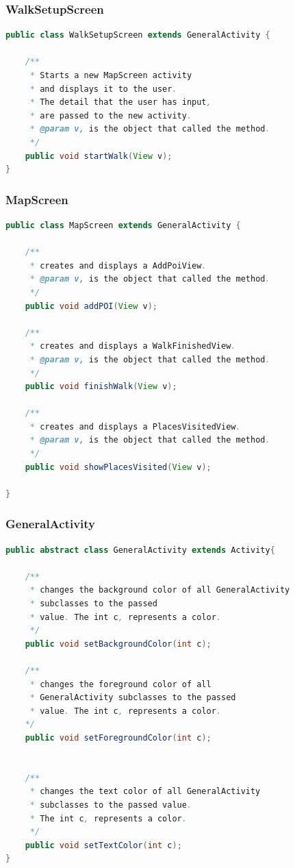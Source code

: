 \documentclass[12pt]{article}
\begin{document}
\subsubsection{WalkSetupScreen}
\begin{lstlisting}[language=java]
public class WalkSetupScreen extends GeneralActivity {
	
	/**
	 * Starts a new MapScreen activity
	 * and displays it to the user.
	 * The detail that the user has input,
	 * are passed to the new activity.
	 * @param v, is the object that called the method.		
	 */
	public void startWalk(View v);
}
\end{lstlisting}
\subsubsection{MapScreen}
\begin{lstlisting}[language=java]
public class MapScreen extends GeneralActivity {
	
	/**
	 * creates and displays a AddPoiView.
	 * @param v, is the object that called the method.
	 */
	public void addPOI(View v);
	
	/**
	 * creates and displays a WalkFinishedView.
	 * @param v, is the object that called the method.
	 */
	public void finishWalk(View v);
	
	/**
	 * creates and displays a PlacesVisitedView.
	 * @param v, is the object that called the method.
	 */
	public void showPlacesVisited(View v);

}
\end{lstlisting}
\subsubsection{GeneralActivity}
\begin{lstlisting}[language=java]
public abstract class GeneralActivity extends Activity{

	/**
	 * changes the background color of all GeneralActivity
	 * subclasses to the passed
	 * value. The int c, represents a color.	
	 */
	public void setBackgroundColor(int c);

	/**
	 * changes the foreground color of all
	 * GeneralActivity subclasses to the passed 
	 * value. The int c, represents a color.	 		
	*/
	public void setForegroundColor(int c);

	
	/**
	 * changes the text color of all GeneralActivity
	 * subclasses to the passed value.
	 * The int c, represents a color.
	 */
	public void setTextColor(int c);
}
\end{lstlisting}
\end{document}
